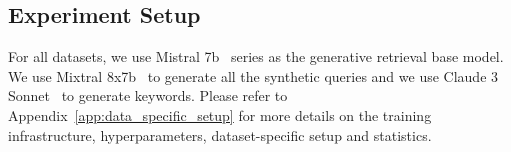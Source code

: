 \subsection{Experiment Setup}
\label{sec:experiment_setup}
For all datasets, we use Mistral 7b~\citep{DBLP:journals/corr/abs-2310-06825} series as the generative retrieval base model. We use Mixtral 8x7b~\citep{DBLP:journals/corr/abs-2401-04088} to generate all the synthetic queries and we use Claude 3 Sonnet~\citep{anthropic2024claude} to generate keywords. Please refer to Appendix~\ref{app:data_specific_setup} for more details on the training infrastructure, hyperparameters, dataset-specific setup and statistics.

